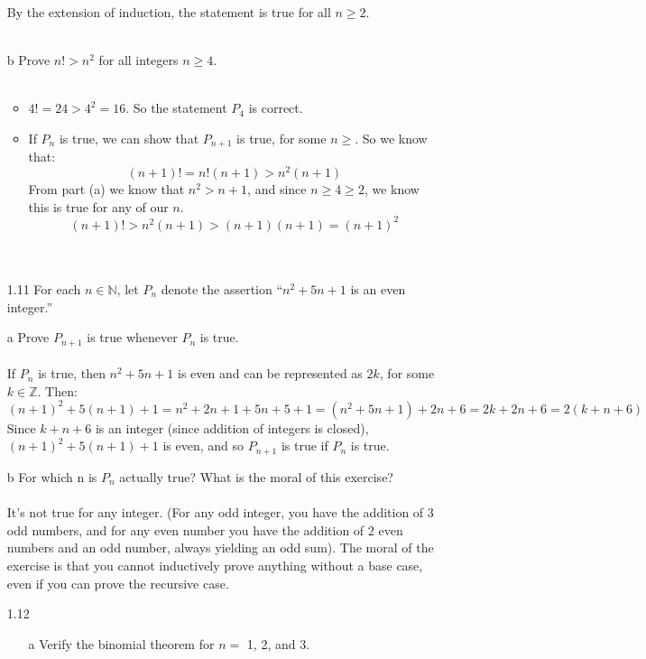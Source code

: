 \begin{itemize}
      By the extension of induction, the statement is true for all $n \geq 2$.\\\\

    \item [b] Prove $n! > n^2$ for all integers $n \geq 4$.\\\\
      \begin{itemize}
        \item 
          $4! = 24 > 4^2 = 16$. So the statement $P_4$ is correct.

        \item
          If $P_n$ is true, we can show that $P_{n+1}$ is true, for some $n \geq$. So we know that:
          $$(n+1)! = n!(n+1) > n^2(n+1)$$
          From part (a) we know that $n^2 > n + 1$, and since $n \geq 4 \geq 2$, we know this is true for any of our $n$.
          $$(n+1)! > n^2(n+1) > (n+1)(n+1) = (n+1)^2$$ \\\\
      \end{itemize}
  \item [1.11]
    For each $n \in \mathds{N}$, let $P_n$ denote the assertion ``$n^2 + 5n + 1$ is an even integer.''
    \item [a] Prove $P_{n+1}$ is true whenever $P_n$ is true.\\\\
      If $P_n$ is true, then $n^2 + 5n + 1$ is even and can be represented as $2k$, for some $k \in \mathds{Z}$.
      Then:
      $$(n+1)^2 + 5(n+1) + 1 = n^2 + 2n + 1 + 5n + 5 + 1 = (n^2+5n+1) + 2n + 6 = 2k + 2n + 6 = 2(k + n + 6)$$
      Since $k + n + 6$ is an integer (since addition of integers is closed), $(n+1)^2 + 5(n+1) + 1$ is even, and so $P_{n+1}$ is true if $P_n$ is true.\\

    \item [b] For which n is $P_n$ actually true? What is the moral of this exercise?\\\\

      It's not true for any integer. (For any odd integer, you have the addition of 3 odd numbers, and for any even number you have the addition of 2 even numbers and an odd number, always yielding an odd sum). The moral of the exercise is that you cannot inductively prove anything without a base case, even if you can prove the recursive case.
  \item [1.12]
    \begin{itemize}
    \item [a] 
      Verify the binomial theorem for $n = $ 1, 2, and 3.\\\\
      

\end{itemize}
\end{itemize}
